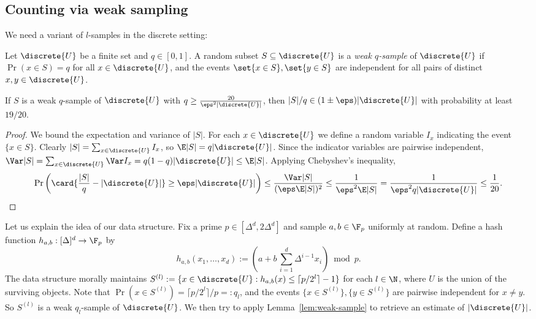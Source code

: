 \subsection{Counting via weak sampling}
We need a variant of $l$-samples in the discrete setting:
\begin{definition}
    Let $\discrete{U}$ be a finite set and $q \in [0,1]$. A random subset $S \subseteq \discrete{U}$ is a \emph{weak $q$-sample} of $\discrete{U}$ if $\Pr(x \in S) = q$ for all $x \in \discrete{U}$, and the events $\set{x \in S}, \set{y \in S}$ are independent for all pairs of distinct $x,y \in \discrete{U}$.
\end{definition}
%
\begin{lemma}
    \label{lem:weak-sample}
    If $S$ is a weak $q$-sample of $\discrete{U}$ with $q \geq \frac{20}{\eps^2 |\discrete{U}|}$, then $|S|/q \in (1 \pm \eps) |\discrete{U}|$ with probability at least $19/20$.
\end{lemma}
%
\begin{proof}
    We bound the expectation and variance of $|S|$. For each $x \in \discrete{U}$ we define a random variable $I_x$ indicating the event $\{x \in S\}$. Clearly $|S| = \sum_{x \in \discrete{U}} I_x$, so $\E |S| = q|\discrete{U}|$. Since the indicator variables are pairwise independent, $\Var |S| = \sum_{x \in \discrete{U}} \Var I_x = q(1-q) |\discrete{U}| \leq \E |S|$. Applying Chebyshev's inequality,
    \[
        \Pr \left( \card{\frac{|S|}{q} - |\discrete{U}|} \geq \eps |\discrete{U}| \right)
        \leq \frac{\Var |S|}{(\eps \E |S|)^2}
        \leq \frac{1}{\eps^2 \E |S|}
        = \frac{1}{\eps^2 q|\discrete{U}|}
        \leq \frac{1}{20}. \qedhere
    \]
    \aftermath
\end{proof}
%
Let us explain the idea of our data structure. Fix a prime $p \in [\Delta^d, 2 \Delta^d]$ and sample $a,b \in \F_p$ uniformly at random. Define a hash function $h_{a,b}: [\Delta]^d \to \F_p$ by
\[ h_{a,b}(x_1, \dots, x_d) := \left( a + b\,\sum_{i=1}^d \Delta^{i-1} x_i \right) \bmod p. \]
The data structure morally maintains $S^{(l)} := \{x \in \discrete{U} : h_{a,b}(x) \leq \lceil p/2^l \rceil-1\}$ for each $l \in \N$, where $U$ is the union of the surviving objects. Note that $\Pr(x \in S^{(l)}) = \lceil p/2^l\rceil / p =: q_l$, and the events $\{x \in S^{(l)}\}, \{y \in S^{(l)}\}$ are pairwise independent for $x \neq y$. So $S^{(l)}$ is a weak $q_l$-sample of $\discrete{U}$. We then try to apply Lemma~\ref{lem:weak-sample} to retrieve an estimate of $|\discrete{U}|$.
%
